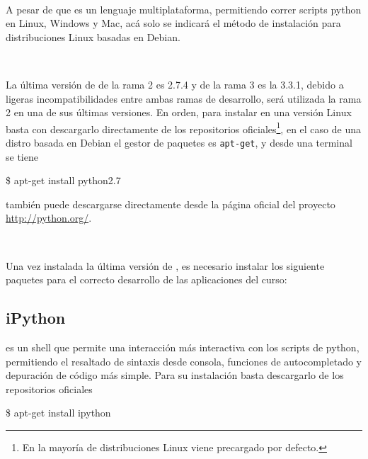 \

A pesar de que \python es un lenguaje multiplataforma, permitiendo correr 
scripts python en Linux, Windows y Mac, acá solo se indicará el método de 
instalación para distribuciones Linux basadas en Debian.

\

La última versión de \python de la rama 2 es 2.7.4 y de la rama 3 es la 
3.3.1, debido a ligeras incompatibilidades entre ambas ramas de desarrollo, 
será utilizada la rama 2 en una de sus últimas versiones. En orden, para 
instalar \python en una versión Linux basta con descargarlo directamente 
de los repositorios oficiales\footnote{En la mayoría de distribuciones Linux
\python viene precargado por defecto.}, en el caso de una distro basada 
en Debian el gestor de paquetes es \texttt{apt-get}, y desde una terminal 
se tiene


\begin{listing}[style=consola, numbers=none]
\$ apt-get install python2.7
\end{listing}


también puede descargarse directamente desde la página oficial del proyecto 
\url{http://python.org/}.

\

Una vez instalada la última versión de \python, es necesario instalar los
siguiente paquetes para el correcto desarrollo de las aplicaciones del 
curso:


\subsection*{iPython}

\ipython es un shell que permite una interacción más interactiva con los
scripts de python, permitiendo el resaltado de sintaxis desde consola, 
funciones de autocompletado y depuración de código más simple. Para su 
instalación basta descargarlo de los repositorios oficiales 


\begin{listing}[style=consola, numbers=none]
\$ apt-get install ipython
\end{listing}


